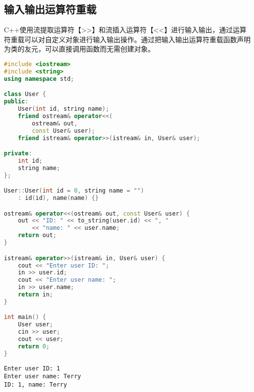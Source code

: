 \vspace{0.5cm}

\subsection{输入输出运算符重载}

C++使用流提取运算符【>>】和流插入运算符【<<】进行输入输出，通过运算符重载可以对自定义对象进行输入输出操作。通过把输入输出运算符重载函数声明为类的友元，可以直接调用函数而无需创建对象。\\


\begin{lstlisting}[language=C++]
#include <iostream>
#include <string>
using namespace std;

class User {
public:
    User(int id, string name);
    friend ostream& operator<<(
        ostream& out,
        const User& user);
    friend istream& operator>>(istream& in, User& user);

private:
    int id;
    string name;
};

User::User(int id = 0, string name = "")
    : id(id), name(name) {}

ostream& operator<<(ostream& out, const User& user) {
    out << "ID: " << to_string(user.id) << ", "
        << "name: " << user.name;
    return out;
}

istream& operator>>(istream& in, User& user) {
    cout << "Enter user ID: ";
    in >> user.id;
    cout << "Enter user name: ";
    in >> user.name;
    return in;
}

int main() {
    User user;
    cin >> user;
    cout << user;
    return 0;
}
\end{lstlisting}

\begin{tcolorbox}
	\begin{verbatim}
Enter user ID: 1
Enter user name: Terry
ID: 1, name: Terry
	\end{verbatim}
\end{tcolorbox}

\newpage